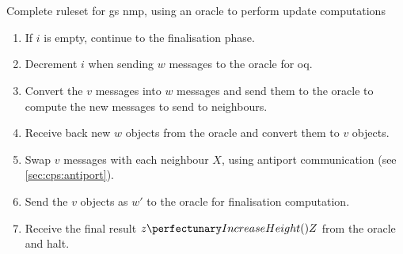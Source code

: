 \begin{cprulesetfloat}
    \begin{cpruleset}
        
        
        
        
        
        \\
        
        
        \\
        
        
        
    \end{cpruleset}
    \caption[Complete \gls{ruleset} for \gls{gs} ]{\label{ruleset:nmp:systemwide}Complete \gls{ruleset} for \gls{gs} \gls{nmp}, using an oracle to perform update computations}
\end{cprulesetfloat}

\begin{enumerate}
    \item If \(i\) is empty, continue to the finalisation phase.
    \item Decrement \(i\) when sending \(w\) messages to the oracle for \gls{oq}.
    \item Convert the \(v\) messages into \(w\) messages and send them to the oracle to compute the new messages to send to neighbours.
    \item Receive back new \(w\) objects from the oracle and convert them to \(v\) objects.
    \item Swap \(v\) messages with each neighbour \(X\), using antiport communication (see \cref{sec:cps:antiport}).
    \item Send the \(v\) objects as \(w'\) to the oracle for finalisation computation.
    \item Receive the final result \(\cpfunc{z}{Z}\) from the oracle and halt.
\end{enumerate}

